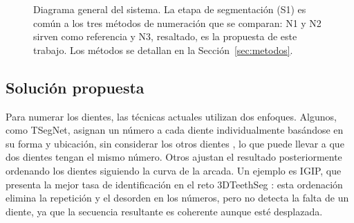 \begin{figure}[htbp]
{%
    }
    \caption[Diagrama general del sistema]{Diagrama general del sistema. La etapa de segmentación (S1) es común a los tres métodos de numeración que se comparan: N1 y N2 sirven como referencia y N3, resaltado, es la propuesta de este trabajo. Los métodos se detallan en la Sección~\ref{sec:metodos}.}
    \label{fig:diagrama-sistema}
\end{figure}


\subsection{Solución propuesta}
\label{subsec:solucion-propuesta}

Para numerar los dientes, las técnicas actuales utilizan dos enfoques. Algunos, como TSegNet, asignan un número a cada diente individualmente basándose en su forma y ubicación, sin considerar los otros dientes \cite{cuiTSegNetEfficientAccurate2021}, lo que puede llevar a que dos dientes tengan el mismo número. Otros ajustan el resultado posteriormente ordenando los dientes siguiendo la curva de la arcada. Un ejemplo es IGIP, que presenta la mejor tasa de identificación en el reto 3DTeethSeg \cite{ben-hamadou3DTeethSeg223DTeeth2023}: esta ordenación elimina la repetición y el desorden en los números, pero no detecta la falta de un diente, ya que la secuencia resultante es coherente aunque esté desplazada.

